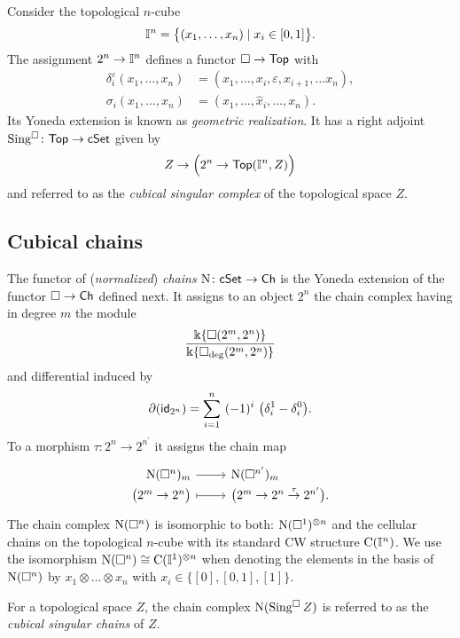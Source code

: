 Consider the topological $n$-cube
\begin{equation} \label{e:topological cube}
\mathbb{I}^{n} = \big\{ (x_1, \dots, x_n) \mid x_i \in [0,1] \big\}.
\end{equation}
The assignment $2^n \to \mathbb{I}^n$ defines a functor $\square \to \mathsf{Top}$ with
\begin{align*}
\delta^\varepsilon_i(x_1, \dots, x_n) &= (x_1, \dots, x_i, \varepsilon, x_{i+1}, \dots x_n), \\
\sigma_i(x_1,\dots,x_n) &= (x_1, \dots, \widehat{x}_i, \dots, x_n).
\end{align*}
Its Yoneda extension is known as \textit{geometric realization}.
It has a right adjoint $\operatorname{Sing^{\square}} \colon \mathsf{Top} \to \mathsf{cSet}$ given by
\[
Z \to \Big(2^n \to \mathsf{Top}(\mathbb{I}^n, Z)\Big)
\]
and referred to as the \textit{cubical singular complex} of the topological space $Z$.

\subsection{Cubical chains}

The functor of (\textit{normalized}) \textit{chains} $\operatorname{N} \colon \mathsf{cSet} \to \mathsf{Ch}$ is the Yoneda extension of the functor $\square \to \mathsf{Ch}$ defined next.
It assigns to an object $2^n$ the chain complex having in degree $m$ the module
\[
\frac{\Bbbk\{\square(2^m, 2^n)\}}{\Bbbk\{\square_{\deg}(2^m, 2^n)\}}
\]
and differential induced by
\[
\partial (\id_{2^n}) = \sum_{i=1}^{n} \ (-1)^i \
\big(\delta_i^1 - \delta_i^0 \big).
\]
To a morphism $\tau \colon 2^n \to 2^{n^\prime}$ it assigns the chain map
\[
\begin{tikzcd}[row sep=-3pt, column sep=normal,
/tikz/column 1/.append style={anchor=base east},
/tikz/column 2/.append style={anchor=base west}]
\chains(\cube^n)_m \arrow[r] & \chains(\cube^{n^\prime})_m \\
\big( 2^m \to 2^n \big) \arrow[r, mapsto] & \big( 2^m \to 2^n \stackrel{\tau}{\to} 2^{n^\prime} \big).
\end{tikzcd}
\]
The chain complex $\operatorname{N}(\square^n)$ is isomorphic to both: $\operatorname{N}(\square^1)^{\otimes n}$ and the cellular chains on the topological $n$-cube with its standard CW structure $\operatorname{C}(\mathbb{I}^n)$.
We use the isomorphism $\operatorname{N}(\square^n) \cong \operatorname{C}(\mathbb{I}^1)^{\otimes n}$ when denoting the elements in the basis of $\operatorname{N}(\square^n)$ by $x_1 \otimes \dots \otimes x_n$ with $x_i \in \{[0], [0,1], [1]\}$.

For a topological space $Z$, the chain complex $\operatorname{N}(\operatorname{Sing^{\square}} Z)$ is referred to as the \textit{cubical singular chains} of $Z$.

